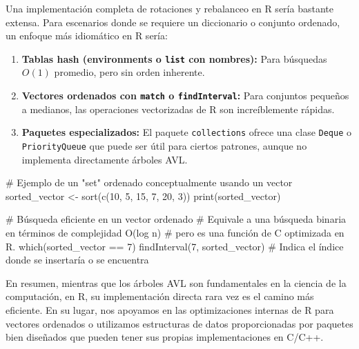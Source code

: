 \documentclass[
  spanish,
  letterpaper,
  DIV=11,
  numbers=noendperiod]{scrreprt}
\newenvironment{Shaded}{\begin{snugshade}}{\end{snugshade}}
\newcommand{\CommentTok}[1]{\textcolor[rgb]{0.37,0.37,0.37}{#1}}
\newcommand{\DecValTok}[1]{\textcolor[rgb]{0.68,0.00,0.00}{#1}}
\newcommand{\FunctionTok}[1]{\textcolor[rgb]{0.28,0.35,0.67}{#1}}
\newcommand{\NormalTok}[1]{\textcolor[rgb]{0.00,0.23,0.31}{#1}}
\newcommand{\OtherTok}[1]{\textcolor[rgb]{0.00,0.23,0.31}{#1}}
\newcommand{\SpecialCharTok}[1]{\textcolor[rgb]{0.37,0.37,0.37}{#1}}
\providecommand{\tightlist}{%
  \setlength{\itemsep}{0pt}\setlength{\parskip}{0pt}}
\begin{document}
Una implementación completa de rotaciones y rebalanceo en R sería
bastante extensa. Para escenarios donde se requiere un diccionario o
conjunto ordenado, un enfoque más idiomático en R sería:

\begin{enumerate}
\def\labelenumi{\arabic{enumi}.}
\tightlist
\item
  \textbf{Tablas hash (environments o \texttt{list} con nombres):} Para
  búsquedas \(O(1)\) promedio, pero sin orden inherente.
\item
  \textbf{Vectores ordenados con \texttt{match} o
  \texttt{findInterval}:} Para conjuntos pequeños a medianos, las
  operaciones vectorizadas de R son increíblemente rápidas.
\item
  \textbf{Paquetes especializados:} El paquete \texttt{collections}
  ofrece una clase \texttt{Deque} o \texttt{PriorityQueue} que puede ser
  útil para ciertos patrones, aunque no implementa directamente árboles
  AVL.
\end{enumerate}

\begin{Shaded}
\begin{Highlighting}[]
\CommentTok{\# Ejemplo de un "set" ordenado conceptualmente usando un vector}
\NormalTok{sorted\_vector }\OtherTok{\textless{}{-}} \FunctionTok{sort}\NormalTok{(}\FunctionTok{c}\NormalTok{(}\DecValTok{10}\NormalTok{, }\DecValTok{5}\NormalTok{, }\DecValTok{15}\NormalTok{, }\DecValTok{7}\NormalTok{, }\DecValTok{20}\NormalTok{, }\DecValTok{3}\NormalTok{))}
\FunctionTok{print}\NormalTok{(sorted\_vector)}

\CommentTok{\# Búsqueda eficiente en un vector ordenado}
\CommentTok{\# Equivale a una búsqueda binaria en términos de complejidad O(log n)}
\CommentTok{\# pero es una función de C optimizada en R.}
\FunctionTok{which}\NormalTok{(sorted\_vector }\SpecialCharTok{==} \DecValTok{7}\NormalTok{)}
\FunctionTok{findInterval}\NormalTok{(}\DecValTok{7}\NormalTok{, sorted\_vector) }\CommentTok{\# Indica el índice donde se insertaría o se encuentra}
\end{Highlighting}
\end{Shaded}

En resumen, mientras que los árboles AVL son fundamentales en la ciencia
de la computación, en R, su implementación directa rara vez es el camino
más eficiente. En su lugar, nos apoyamos en las optimizaciones internas
de R para vectores ordenados o utilizamos estructuras de datos
proporcionadas por paquetes bien diseñados que pueden tener sus propias
implementaciones en C/C++.
\end{document}

